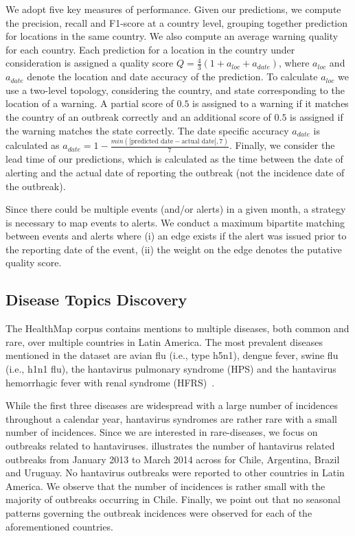 \documentclass[conference]{IEEEtran}
\begin{document}
 We adopt five key measures of performance. Given our predictions, we compute the precision, recall and F1-score at a country level, grouping together prediction for locations in the same country. We also compute an average warning quality for each country. Each prediction for a location in the country under consideration is assigned a quality score $Q = \frac{4}{3}(1 + a_{loc} + a_{date})$, where $a_{loc}$ and $a_{date}$ denote the location and date accuracy of the prediction. To calculate $a_{loc}$ we use a two-level topology, considering the country, and state corresponding to the location of a warning. A partial score of $0.5$ is assigned to a warning if it matches the country of an outbreak correctly and an additional score of $0.5$ is assigned if the warning matches the state correctly. The date specific accuracy $a_{date}$ is calculated as $a_{date} = 1 - \frac{min(|\mbox{predicted date} - \mbox{actual date}|,7)}{7}$. Finally, we consider the lead time of our predictions, which is calculated as the time between the date of alerting and the actual date of reporting the outbreak (not the incidence date of the outbreak). 

 Since there could be multiple events (and/or alerts) in a given month, a strategy is necessary to map events to alerts. We conduct a maximum bipartite matching between events and alerts where (i) an edge exists if the alert was issued prior to the reporting date of the event, (ii) the weight on the edge denotes the putative quality score. 

\subsection{Disease Topics Discovery}
The HealthMap corpus contains mentions to multiple diseases, both common and rare, over multiple countries in Latin America. The most prevalent diseases mentioned in the dataset are avian flu (i.e., type h5n1), dengue fever, swine flu (i.e., h1n1 flu), the hantavirus pulmonary syndrome (HPS) and the hantavirus hemorrhagic fever with renal syndrome (HFRS)~\cite{jonsson:10}. 

While the first three diseases are widespread with a large number of incidences throughout a calendar year, hantavirus syndromes are rather rare with a small number of incidences. Since we are interested in rare-diseases, we focus on outbreaks related to hantaviruses.  illustrates the number of hantavirus related outbreaks from January 2013 to March 2014 across for Chile, Argentina, Brazil and Uruguay. No hantavirus outbreaks were reported to other countries in Latin America. We observe that the number of incidences is rather small with the majority of outbreaks occurring in Chile. Finally, we point out that no seasonal patterns governing the outbreak incidences were observed for each of the aforementioned countries.
\end{document}
